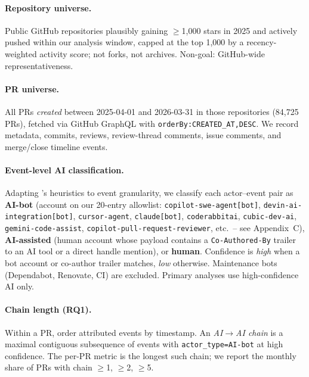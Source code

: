\documentclass{article}
\begin{document}
\paragraph{Repository universe.} Public GitHub repositories plausibly gaining $\geq$1{,}000 stars in 2025 and actively pushed within our analysis window, capped at the top 1,000{} by a recency-weighted activity score; not forks, not archives. Non-goal: GitHub-wide representativeness.

\paragraph{PR universe.} All PRs \emph{created} between 2025-04-01 and 2026-03-31 in those repositories (84,725{} PRs), fetched via GitHub GraphQL with \texttt{orderBy:{CREATED\_AT,DESC}}. We record metadata, commits, reviews, review-thread comments, issue comments, and merge/close timeline events.

\paragraph{Event-level AI classification.} Adapting \citet{ghaleb2026fingerprinting}'s heuristics to event granularity, we classify each actor--event pair as \textbf{AI-bot} (account on our 20-entry allowlist: \texttt{copilot-swe-agent[bot]}, \texttt{devin-ai-integration[bot]}, \texttt{cursor-agent}, \texttt{claude[bot]}, \texttt{coderabbitai}, \texttt{cubic-dev-ai}, \texttt{gemini-code-assist}, \texttt{copilot-pull-request-reviewer}, etc.\ -- see Appendix~C), \textbf{AI-assisted} (human account whose payload contains a \texttt{Co-Authored-By} trailer to an AI tool or a direct handle mention), or \textbf{human}. Confidence is \emph{high} when a bot account or co-author trailer matches, \emph{low} otherwise. Maintenance bots (Dependabot, Renovate, CI) are excluded. Primary analyses use high-confidence AI only.

\paragraph{Chain length (RQ1).} Within a PR, order attributed events by timestamp. An \emph{AI$\to$AI chain} is a maximal contiguous subsequence of events with \texttt{actor\_type=AI-bot} at high confidence. The per-PR metric is the longest such chain; we report the monthly share of PRs with chain $\geq$1, $\geq$2, $\geq$5.
\end{document}
